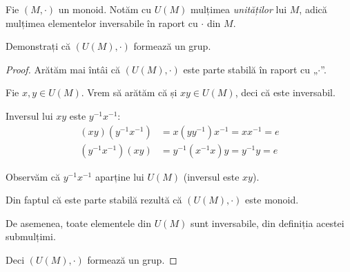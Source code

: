 \begin{exercise}
Fie \((M, \cdot)\) un monoid. Notăm cu \(U(M)\) mulțimea \emph{unităților} lui \(M\), adică mulțimea elementelor inversabile în raport cu \(\cdot\) din \(M\).

Demonstrați că \((U(M), \cdot)\) formează un grup.
\end{exercise}
\begin{proof}
Arătăm mai întâi că \((U(M), \cdot)\) este parte stabilă în raport cu „\(\cdot\)”.

Fie \(x, y \in U(M)\). Vrem să arătăm că și \(x y \in U(M)\), deci că este inversabil. 

Inversul lui \(x y\) este \(y^{-1} x^{-1}\):
\begin{align*}
    (x y) (y^{-1} x^{-1}) &= x (y y^{-1}) x^{-1} = x x^{-1} = e \\
    (y^{-1} x^{-1}) (x y) &= y^{-1} (x^{-1} x) y = y^{-1} y = e
\end{align*}

Observăm că \(y^{-1} x^{-1}\) aparține lui \(U(M)\) (inversul este \(x y\)).

Din faptul că este parte stabilă rezultă că \((U(M), \cdot)\) este monoid.

De asemenea, toate elementele din \(U(M)\) sunt inversabile, din definiția acestei submulțimi.

Deci \((U(M), \cdot)\) formează un grup.
\end{proof}

